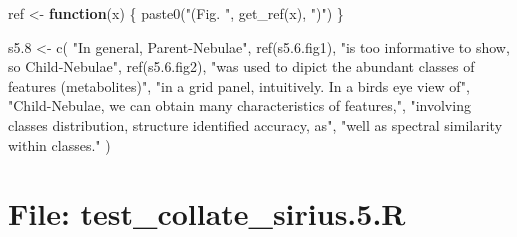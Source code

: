 \documentclass[
]{article}
\newenvironment{Shaded}{\begin{snugshade}}{\end{snugshade}}
\newcommand{\ControlFlowTok}[1]{\textcolor[rgb]{0.13,0.29,0.53}{\textbf{#1}}}
\newcommand{\FloatTok}[1]{\textcolor[rgb]{0.00,0.00,0.81}{#1}}
\newcommand{\FunctionTok}[1]{\textcolor[rgb]{0.00,0.00,0.00}{#1}}
\newcommand{\NormalTok}[1]{#1}
\newcommand{\OtherTok}[1]{\textcolor[rgb]{0.56,0.35,0.01}{#1}}
\newcommand{\StringTok}[1]{\textcolor[rgb]{0.31,0.60,0.02}{#1}}
\begin{document}
\begin{Shaded}
\begin{Highlighting}[]
\NormalTok{ref }\OtherTok{\textless{}{-}} \ControlFlowTok{function}\NormalTok{(x) \{}
  \FunctionTok{paste0}\NormalTok{(}\StringTok{"(Fig. "}\NormalTok{, }\FunctionTok{get\_ref}\NormalTok{(x), }\StringTok{")"}\NormalTok{)}
\NormalTok{\}}

\NormalTok{s5}\FloatTok{.8} \OtherTok{\textless{}{-}} \FunctionTok{c}\NormalTok{(}
  \StringTok{"In general, Parent{-}Nebulae"}\NormalTok{, }\FunctionTok{ref}\NormalTok{(s5.}\FloatTok{6.}\NormalTok{fig1),}
  \StringTok{"is too informative to show, so Child{-}Nebulae"}\NormalTok{, }\FunctionTok{ref}\NormalTok{(s5.}\FloatTok{6.}\NormalTok{fig2),}
  \StringTok{"was used to dipict the abundant classes of features (metabolites)"}\NormalTok{,}
  \StringTok{"in a grid panel, intuitively. In a bird\textquotesingle{}s eye view of"}\NormalTok{,}
  \StringTok{"Child{-}Nebulae, we can obtain many characteristics of features,"}\NormalTok{,}
  \StringTok{"involving classes distribution, structure identified accuracy, as"}\NormalTok{,}
  \StringTok{"well as spectral similarity within classes."}
\NormalTok{)}
\end{Highlighting}
\end{Shaded}

\hypertarget{file-test_collate_sirius.5.r}{%
\section{File: test\_collate\_sirius.5.R}\label{file-test_collate_sirius.5.r}}
\end{document}
